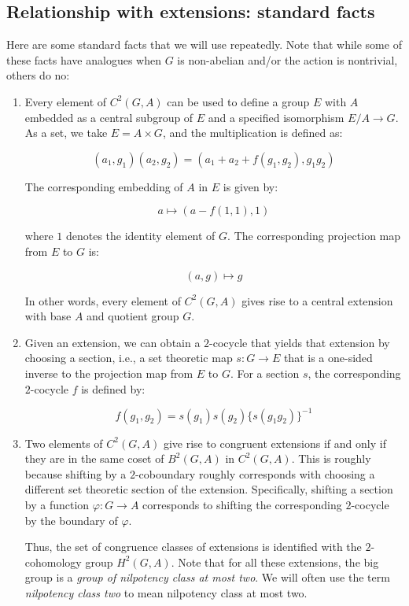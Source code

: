 \documentclass[10pt]{amsart}
\begin{document}
\subsection{Relationship with extensions: standard facts}

Here are some standard facts that we will use repeatedly. Note that
while some of these facts have analogues when $G$ is non-abelian
and/or the action is nontrivial, others do no:

\begin{enumerate}
\item Every element of $C^2(G,A)$ can be used to define a group $E$
  with $A$ embedded as a central subgroup of $E$ and a specified
  isomorphism $E/A \to G$. As a set, we take $E = A \times G$, and the
  multiplication is defined as:

  $$(a_1,g_1)(a_2,g_2) = (a_1 + a_2 + f(g_1,g_2), g_1g_2)$$

  The corresponding embedding of $A$ in $E$ is given by:

  $$a \mapsto (a - f(1,1), 1)$$

  where $1$ denotes the identity element of $G$. The corresponding
  projection map from $E$ to $G$ is:

  $$(a,g) \mapsto g$$

  In other words, every element of $C^2(G,A)$ gives rise to a central
  extension with base $A$ and quotient group $G$.
\item Given an extension, we can obtain a $2$-cocycle that yields that
  extension by choosing a section, i.e., a set theoretic map $s:G \to
  E$ that is a one-sided inverse to the projection map from $E$ to
  $G$. For a section $s$, the corresponding $2$-cocycle $f$ is defined
  by:

  $$f(g_1,g_2) = s(g_1)s(g_2)\{s(g_1g_2)\}^{-1}$$

\item Two elements of $C^2(G,A)$ give rise to congruent extensions if
  and only if they are in the same coset of $B^2(G,A)$ in
  $C^2(G,A)$. This is roughly because shifting by a $2$-coboundary
  roughly corresponds with choosing a different set theoretic section
  of the extension. Specifically, shifting a section by a function
  $\varphi:G \to A$ corresponds to shifting the corresponding
  $2$-cocycle by the boundary of $\varphi$.

  Thus, the set of congruence classes of extensions is identified with
  the $2$-cohomology group $H^2(G,A)$. Note that for all these
  extensions, the big group is a {\em group of nilpotency class at
  most two}. We will often use the term {\em nilpotency class two} to
  mean nilpotency class at most two.


\end{enumerate}
\end{document}
